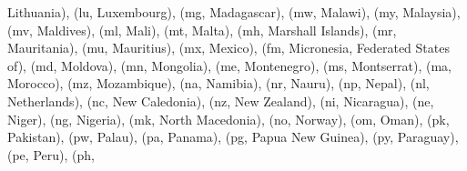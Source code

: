 \documentclass[letterpaper,10pt,english]{sphinxmanual}
\begin{document}
\begin{fulllineitems}
\begin{fulllineitems}
\textquotesingle{}Lithuania\textquotesingle{}), (\textquotesingle{}lu\textquotesingle{}, \textquotesingle{}Luxembourg\textquotesingle{}), (\textquotesingle{}mg\textquotesingle{}, \textquotesingle{}Madagascar\textquotesingle{}), (\textquotesingle{}mw\textquotesingle{}, \textquotesingle{}Malawi\textquotesingle{}), (\textquotesingle{}my\textquotesingle{}, \textquotesingle{}Malaysia\textquotesingle{}), (\textquotesingle{}mv\textquotesingle{}, \textquotesingle{}Maldives\textquotesingle{}), (\textquotesingle{}ml\textquotesingle{}, \textquotesingle{}Mali\textquotesingle{}), (\textquotesingle{}mt\textquotesingle{}, \textquotesingle{}Malta\textquotesingle{}), (\textquotesingle{}mh\textquotesingle{}, \textquotesingle{}Marshall Islands\textquotesingle{}), (\textquotesingle{}mr\textquotesingle{}, \textquotesingle{}Mauritania\textquotesingle{}), (\textquotesingle{}mu\textquotesingle{}, \textquotesingle{}Mauritius\textquotesingle{}), (\textquotesingle{}mx\textquotesingle{}, \textquotesingle{}Mexico\textquotesingle{}), (\textquotesingle{}fm\textquotesingle{}, \textquotesingle{}Micronesia, Federated States of\textquotesingle{}), (\textquotesingle{}md\textquotesingle{}, \textquotesingle{}Moldova\textquotesingle{}), (\textquotesingle{}mn\textquotesingle{}, \textquotesingle{}Mongolia\textquotesingle{}), (\textquotesingle{}me\textquotesingle{}, \textquotesingle{}Montenegro\textquotesingle{}), (\textquotesingle{}ms\textquotesingle{}, \textquotesingle{}Montserrat\textquotesingle{}), (\textquotesingle{}ma\textquotesingle{}, \textquotesingle{}Morocco\textquotesingle{}), (\textquotesingle{}mz\textquotesingle{}, \textquotesingle{}Mozambique\textquotesingle{}), (\textquotesingle{}na\textquotesingle{}, \textquotesingle{}Namibia\textquotesingle{}), (\textquotesingle{}nr\textquotesingle{}, \textquotesingle{}Nauru\textquotesingle{}), (\textquotesingle{}np\textquotesingle{}, \textquotesingle{}Nepal\textquotesingle{}), (\textquotesingle{}nl\textquotesingle{}, \textquotesingle{}Netherlands\textquotesingle{}), (\textquotesingle{}nc\textquotesingle{}, \textquotesingle{}New Caledonia\textquotesingle{}), (\textquotesingle{}nz\textquotesingle{}, \textquotesingle{}New Zealand\textquotesingle{}), (\textquotesingle{}ni\textquotesingle{}, \textquotesingle{}Nicaragua\textquotesingle{}), (\textquotesingle{}ne\textquotesingle{}, \textquotesingle{}Niger\textquotesingle{}), (\textquotesingle{}ng\textquotesingle{}, \textquotesingle{}Nigeria\textquotesingle{}), (\textquotesingle{}mk\textquotesingle{}, \textquotesingle{}North Macedonia\textquotesingle{}), (\textquotesingle{}no\textquotesingle{}, \textquotesingle{}Norway\textquotesingle{}), (\textquotesingle{}om\textquotesingle{}, \textquotesingle{}Oman\textquotesingle{}), (\textquotesingle{}pk\textquotesingle{}, \textquotesingle{}Pakistan\textquotesingle{}), (\textquotesingle{}pw\textquotesingle{}, \textquotesingle{}Palau\textquotesingle{}), (\textquotesingle{}pa\textquotesingle{}, \textquotesingle{}Panama\textquotesingle{}), (\textquotesingle{}pg\textquotesingle{}, \textquotesingle{}Papua New Guinea\textquotesingle{}), (\textquotesingle{}py\textquotesingle{}, \textquotesingle{}Paraguay\textquotesingle{}), (\textquotesingle{}pe\textquotesingle{}, \textquotesingle{}Peru\textquotesingle{}), (\textquotesingle{}ph\textquotesingle{}, 
\end{fulllineitems}
\end{fulllineitems}
\end{document}
